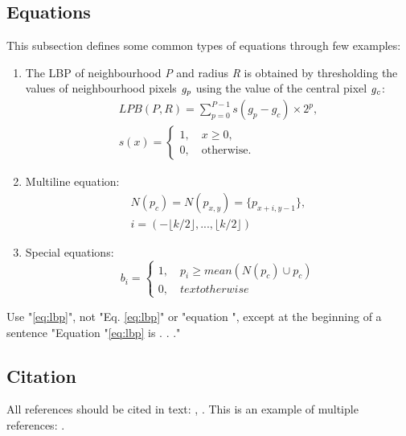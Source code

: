 \documentclass[a4paper,conference]{IEEEtran}
\begin{document}
\subsection{Equations}
\label{subsec3}
This subsection defines some common types of equations through few examples:

\begin{enumerate} %
\item The LBP of neighbourhood {\it P} and radius {\it R} \cite{ref3} is obtained by thresholding the values of neighbourhood pixels ${\it g_p}$ using the value of the central pixel ${\it g_c}$: %
\begin{eqnarray}
LPB(P,R) = \sum\limits_{p=0}^{P-1}{s(g_p-g_c)\times2^p}, \\
s(x) = \left\{
\begin{array}{lr}
1, \quad x \ge 0,\\
0, \quad \text{otherwise.}
\end{array}
\right.
\label{eq:lbp}
\end{eqnarray}
\item Multiline equation: %
\begin{multline}
N(p_c) = N(p_{x,y}) = \{p_{x+i,y-1}\}, \\ i = (-\lfloor k/2 \rfloor,...,\lfloor k/2 \rfloor) \qquad
\label{eq:neigh}
\end{multline}
\item Special equations:
\begin{equation}
b_i = \left\{
\begin{array}{lr}
1, \quad p_i \ge mean(N(p_c) \cup p_c)\\
0, \quad text{otherwise}
\end{array}
\right.
\label{eq:mean}
\end{equation}
\end{enumerate}

Use "\eqref{eq:lbp}", not "Eq. \eqref{eq:lbp}" or "equation ", except at the beginning of a sentence "Equation "\eqref{eq:lbp} is . . ."

\subsection{Citation}
\label{subsec}
All references should be cited in text: \cite{ref1}, \cite{ref2}. This is an example of multiple references: \cite{ref1, ref2, ref3, ref4}.
\end{document}
